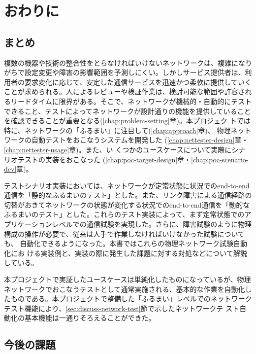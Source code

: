
\chapter{おわりに}

 \section{まとめ}
 \label{sec:summary}

複数の機器や技術の整合性をとらなければいけないネットワークは、複雑になり
がちで設定変更や障害の影響範囲を予測しにくい。しかしサービス提供者は、利
用者の要求変化に応じて、安定した通信サービスを迅速かつ柔軟に提供していく
ことが求められる。人によるレビューや検証作業は、検討可能な範囲や許容され
るリードタイムに限界がある。そこで、ネットワークが機械的・自動的にテスト
できること、テストによってネットワークが設計通りの機能を提供していること
を確認できることが重要となる(\ref{chap:problem-setting}章)。本プロジェク
トでは特に、ネットワークの「ふるまい」に注目して(\ref{chap:approach}章)、
物理ネットワークの自動テストをおこなうシステムを開発した
(\ref{chap:nettester-design}章・\ref{chap:nettester-usage}章)。また、い
くつかのユースケースについて実際にシナリオテストの実装をおこなった
(\ref{chap:poc-target-design}章・\ref{chap:poc-scenario-dev}章)。

テストシナリオ実装においては、ネットワークが定常状態に状況でのend-to-end
通信を「静的なふるまいのテスト」とした。また、リンク障害による通信経路の
切替がおきてネットワークの状態が変化する状況でのend-to-end通信を「動的な
ふるまいのテスト」とした。これらのテスト実装によって、まず定常状態でのア
プリケーションレベルでの通信試験を実現した。さらに、障害試験のように物理
構成の操作が必要で、従来は人手で作業しなければいけなかった試験についても、
自動化できるようになった。本書ではこれらの物理ネットワーク試験自動化にお
ける実装例と、実装の際に発生した課題に対する対処などについて解説している。

本プロジェクトで実証したユースケースは単純化したものになっているが、物理
ネットワークでおこなうテストとして通常実施される、基本的な作業を自動化し
たものである。本プロジェクトで整備した「ふるまい」レベルでのネットワーク
テスト機能により、\ref{sec:discuss-network-test}節で示したネットワークテ
スト自動化の基本機能は一通りそろえることができた。

 \section{今後の課題}
 \label{sec:future-work}

